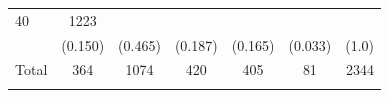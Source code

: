 \documentclass[11pt,a4paper,openany]{book}
\begin{document}
\begin{longtable}[]{@{}lcccccr@{}}
\begin{minipage}[t]{0.08\columnwidth}
40\strut
\end{minipage} & \begin{minipage}[t]{0.05\columnwidth}\raggedleft\strut
1223\strut
\end{minipage}\tabularnewline
\begin{minipage}[t]{0.33\columnwidth}\raggedright\strut
\strut
\end{minipage} & \begin{minipage}[t]{0.08\columnwidth}\centering\strut
(0.150)\strut
\end{minipage} & \begin{minipage}[t]{0.07\columnwidth}\centering\strut
(0.465)\strut
\end{minipage} & \begin{minipage}[t]{0.11\columnwidth}\centering\strut
(0.187)\strut
\end{minipage} & \begin{minipage}[t]{0.08\columnwidth}\centering\strut
(0.165)\strut
\end{minipage} & \begin{minipage}[t]{0.08\columnwidth}\centering\strut
(0.033)\strut
\end{minipage} & \begin{minipage}[t]{0.05\columnwidth}\raggedleft\strut
(1.0)\strut
\end{minipage}\tabularnewline
\begin{minipage}[t]{0.33\columnwidth}\raggedright\strut
Total\strut
\end{minipage} & \begin{minipage}[t]{0.08\columnwidth}\centering\strut
364\strut
\end{minipage} & \begin{minipage}[t]{0.07\columnwidth}\centering\strut
1074\strut
\end{minipage} & \begin{minipage}[t]{0.11\columnwidth}\centering\strut
420\strut
\end{minipage} & \begin{minipage}[t]{0.08\columnwidth}\centering\strut
405\strut
\end{minipage} & \begin{minipage}[t]{0.08\columnwidth}\centering\strut
81\strut
\end{minipage} & \begin{minipage}[t]{0.05\columnwidth}\raggedleft\strut
2344\strut
\end{minipage}\tabularnewline
\begin{minipage}[t]{0.33\columnwidth}\raggedright\strut

\end{minipage}
\end{longtable}
\end{document}
